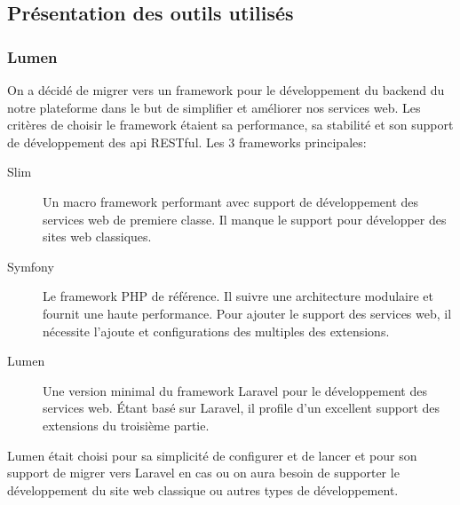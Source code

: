 
\subsection{Présentation des outils utilisés}

\subsubsection{Lumen}

On a décidé de migrer vers un framework pour le développement du backend du
notre plateforme dans le but de simplifier et améliorer nos services web. Les
critères de choisir le framework étaient sa performance, sa stabilité et son
support de développement des api RESTful. Les 3 frameworks principales:
\begin{description}
    \item [Slim] Un macro framework performant avec support de développement
        des services web de premiere classe. Il manque le support pour
        développer des sites web classiques.
    \item [Symfony] Le framework PHP de référence. Il suivre une architecture
        modulaire et fournit une haute performance. Pour ajouter le support des
        services web, il nécessite l'ajoute et configurations des multiples des
        extensions.
    \item [Lumen] Une version minimal du framework Laravel pour le
        développement des services web. Étant basé sur Laravel, il profile d'un
        excellent support des extensions du troisième partie.
\end{description}

Lumen était choisi pour sa simplicité de configurer et de lancer et pour son
support de migrer vers Laravel en cas ou on aura besoin de supporter le
développement du site web classique ou autres types de développement.



